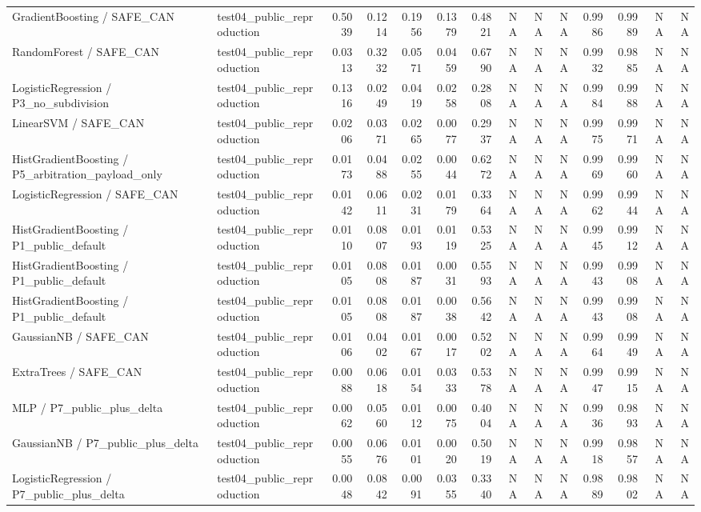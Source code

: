 \begin{tabular}{llrrrrrrrrrrrr}
GradientBoosting / SAFE\_CAN & test04\_public\_reproduction & 0.5039 & 0.1214 & 0.1956 & 0.1379 & 0.4821 & NA & NA & NA & 0.9986 & 0.9989 & NA & NA \\
RandomForest / SAFE\_CAN & test04\_public\_reproduction & 0.0313 & 0.3232 & 0.0571 & 0.0459 & 0.6790 & NA & NA & NA & 0.9932 & 0.9885 & NA & NA \\
LogisticRegression / P3\_no\_subdivision & test04\_public\_reproduction & 0.1316 & 0.0249 & 0.0419 & 0.0258 & 0.2808 & NA & NA & NA & 0.9984 & 0.9988 & NA & NA \\
LinearSVM / SAFE\_CAN & test04\_public\_reproduction & 0.0206 & 0.0371 & 0.0265 & 0.0077 & 0.2937 & NA & NA & NA & 0.9975 & 0.9971 & NA & NA \\
HistGradientBoosting / P5\_arbitration\_payload\_only & test04\_public\_reproduction & 0.0173 & 0.0488 & 0.0255 & 0.0044 & 0.6272 & NA & NA & NA & 0.9969 & 0.9960 & NA & NA \\
LogisticRegression / SAFE\_CAN & test04\_public\_reproduction & 0.0142 & 0.0611 & 0.0231 & 0.0179 & 0.3364 & NA & NA & NA & 0.9962 & 0.9944 & NA & NA \\
HistGradientBoosting / P1\_public\_default & test04\_public\_reproduction & 0.0110 & 0.0807 & 0.0193 & 0.0119 & 0.5325 & NA & NA & NA & 0.9945 & 0.9912 & NA & NA \\
HistGradientBoosting / P1\_public\_default & test04\_public\_reproduction & 0.0105 & 0.0808 & 0.0187 & 0.0031 & 0.5593 & NA & NA & NA & 0.9943 & 0.9908 & NA & NA \\
HistGradientBoosting / P1\_public\_default & test04\_public\_reproduction & 0.0105 & 0.0808 & 0.0187 & 0.0038 & 0.5642 & NA & NA & NA & 0.9943 & 0.9908 & NA & NA \\
GaussianNB / SAFE\_CAN & test04\_public\_reproduction & 0.0106 & 0.0402 & 0.0167 & 0.0017 & 0.5202 & NA & NA & NA & 0.9964 & 0.9949 & NA & NA \\
ExtraTrees / SAFE\_CAN & test04\_public\_reproduction & 0.0088 & 0.0618 & 0.0154 & 0.0333 & 0.5378 & NA & NA & NA & 0.9947 & 0.9915 & NA & NA \\
MLP / P7\_public\_plus\_delta & test04\_public\_reproduction & 0.0062 & 0.0560 & 0.0112 & 0.0075 & 0.4004 & NA & NA & NA & 0.9936 & 0.9893 & NA & NA \\
GaussianNB / P7\_public\_plus\_delta & test04\_public\_reproduction & 0.0055 & 0.0676 & 0.0101 & 0.0020 & 0.5019 & NA & NA & NA & 0.9918 & 0.9857 & NA & NA \\
LogisticRegression / P7\_public\_plus\_delta & test04\_public\_reproduction & 0.0048 & 0.0842 & 0.0091 & 0.0355 & 0.3340 & NA & NA & NA & 0.9889 & 0.9802 & NA & NA \\

\end{tabular}
